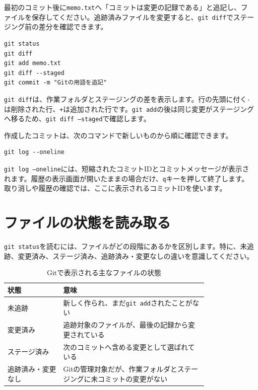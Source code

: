 最初のコミット後に\texttt{memo.txt}へ「コミットは変更の記録である」と追記し、ファイルを保存してください。追跡済みファイルを変更すると、\texttt{git diff}でステージング前の差分を確認できます。

\begin{listing}[htbp]
\begin{verbatim}
git status
git diff
git add memo.txt
git diff --staged
git commit -m "Gitの用語を追記"
\end{verbatim}
\caption{変更内容を確認して2回目のコミットを作るコマンド}
\label{lst:appendix-git-second-commit}
\end{listing}

\texttt{git diff}は、作業フォルダとステージングの差を表示します。行の先頭に付く\texttt{-}は削除された行、\texttt{+}は追加された行です。\texttt{git add}の後は同じ変更がステージングへ移るため、\texttt{git diff --staged}で確認します。

作成したコミットは、次のコマンドで新しいものから順に確認できます。

\begin{listing}[htbp]
\begin{verbatim}
git log --oneline
\end{verbatim}
\caption{コミット履歴を1行ずつ表示するコマンド}
\label{lst:appendix-git-log}
\end{listing}

\texttt{git log --oneline}には、短縮されたコミットIDとコミットメッセージが表示されます。履歴の表示画面が開いたままの場合だけ、\texttt{q}キーを押して終了します。取り消しや履歴の確認では、ここに表示されるコミットIDを使います。

\section{ファイルの状態を読み取る}

\texttt{git status}を読むには、ファイルがどの段階にあるかを区別します。特に、未追跡、変更済み、ステージ済み、追跡済み・変更なしの違いを意識してください。

\begin{table}[htbp]
    \centering
    \caption{Gitで表示される主なファイルの状態}
    \label{tab:appendix-git-file-states}
    \begin{tabular}{p{0.22\linewidth}p{0.58\linewidth}}
        \toprule
        状態 & 意味 \\
        \midrule
        未追跡 & 新しく作られ、まだ\texttt{git add}されたことがない \\
        変更済み & 追跡対象のファイルが、最後の記録から変更されている \\
        ステージ済み & 次のコミットへ含める変更として選ばれている \\
        追跡済み・変更なし & Gitの管理対象だが、作業フォルダとステージングに未コミットの変更がない \\
        \bottomrule
    \end{tabular}
\end{table}

